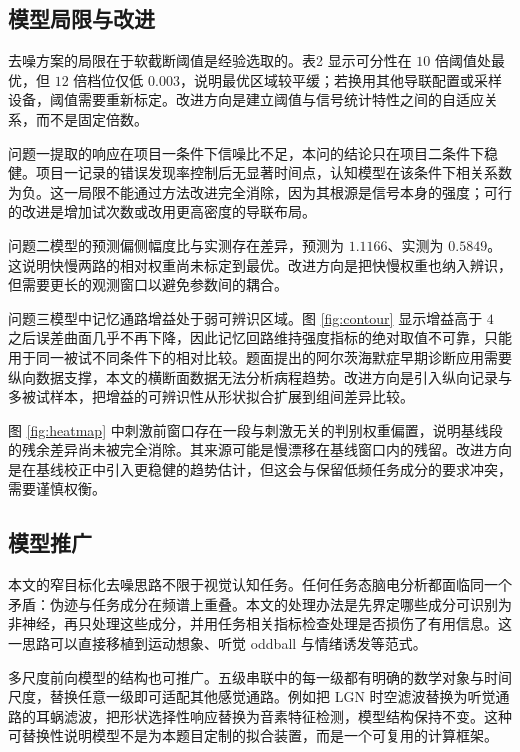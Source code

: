 \documentclass[bwprint]{gmcmthesis}
\begin{document}
\subsection{模型局限与改进}

去噪方案的局限在于软截断阈值是经验选取的。表2 显示可分性在 $10$ 倍阈值处最优，但 $12$ 倍档位仅低 $0.003$，说明最优区域较平缓；若换用其他导联配置或采样设备，阈值需要重新标定。改进方向是建立阈值与信号统计特性之间的自适应关系，而不是固定倍数。

问题一提取的响应在项目一条件下信噪比不足，本问的结论只在项目二条件下稳健。项目一记录的错误发现率控制后无显著时间点，认知模型在该条件下相关系数为负。这一局限不能通过方法改进完全消除，因为其根源是信号本身的强度；可行的改进是增加试次数或改用更高密度的导联布局。

问题二模型的预测偏侧幅度比与实测存在差异，预测为 $1.1166$、实测为 $0.5849$。这说明快慢两路的相对权重尚未标定到最优。改进方向是把快慢权重也纳入辨识，但需要更长的观测窗口以避免参数间的耦合。

问题三模型中记忆通路增益处于弱可辨识区域。图 \ref{fig:contour} 显示增益高于 $4$ 之后误差曲面几乎不再下降，因此记忆回路维持强度指标的绝对取值不可靠，只能用于同一被试不同条件下的相对比较。题面提出的阿尔茨海默症早期诊断应用需要纵向数据支撑，本文的横断面数据无法分析病程趋势。改进方向是引入纵向记录与多被试样本，把增益的可辨识性从形状拟合扩展到组间差异比较。

图 \ref{fig:heatmap} 中刺激前窗口存在一段与刺激无关的判别权重偏置，说明基线段的残余差异尚未被完全消除。其来源可能是慢漂移在基线窗口内的残留。改进方向是在基线校正中引入更稳健的趋势估计，但这会与保留低频任务成分的要求冲突，需要谨慎权衡。

\subsection{模型推广}

本文的窄目标化去噪思路不限于视觉认知任务。任何任务态脑电分析都面临同一个矛盾：伪迹与任务成分在频谱上重叠。本文的处理办法是先界定哪些成分可识别为非神经，再只处理这些成分，并用任务相关指标检查处理是否损伤了有用信息。这一思路可以直接移植到运动想象、听觉 oddball 与情绪诱发等范式。

多尺度前向模型的结构也可推广。五级串联中的每一级都有明确的数学对象与时间尺度，替换任意一级即可适配其他感觉通路。例如把 LGN 时空滤波替换为听觉通路的耳蜗滤波，把形状选择性响应替换为音素特征检测，模型结构保持不变。这种可替换性说明模型不是为本题目定制的拟合装置，而是一个可复用的计算框架。
\end{document}
